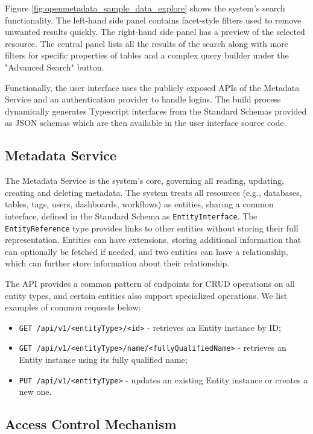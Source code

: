 Figure \ref{fig:openmetadata_sample_data_explore} shows the system's search functionality. The left-hand side panel contains facet-style filters used to remove unwanted results quickly. The right-hand side panel has a preview of the selected resource. The central panel lists all the results of the search along with more filters for specific properties of tables and a complex query builder under the "Advanced Search" button.

Functionally, the user interface uses the publicly exposed APIs of the Metadata Service and an authentication provider to handle logins. The build process dynamically generates Typescript interfaces from the Standard Schemas provided as JSON schemas which are then available in the user interface source code.

\subsection{Metadata Service}

The Metadata Service is the system's core, governing all reading, updating, creating and deleting metadata. The system treats all resources (e.g., databases, tables, tags, users, dashboards, workflows) as entities, sharing a common interface, defined in the Standard Schema as \texttt{EntityInterface}. The \texttt{EntityReference} type provides links to other entities without storing their full representation. Entities can have extensions, storing additional information that can optionally be fetched if needed, and two entities can have a relationship, which can further store information about their relationship.

The API provides a common pattern of endpoints for CRUD operations on all entity types, and certain entities also support specialized operations. We list examples of common requests below:

\begin{itemize}
    \item \texttt{GET /api/v1/<entityType>/<id>} - retrieves an Entity instance by ID;
    \item \texttt{GET /api/v1/<entityType>/name/<fullyQualifiedName>} - retrieves an Entity instance using its fully qualified name;
    \item \texttt{PUT /api/v1/<entityType>} - updates an existing Entity instance or creates a new one.
\end{itemize}

\subsection{Access Control Mechanism}

